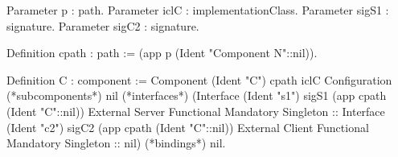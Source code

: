 Parameter p  : path.
Parameter iclC : implementationClass.
Parameter sigS1 : signature.
Parameter sigC2 : signature.

Definition cpath : path := (app p (Ident "Component N"::nil)).

Definition C : component :=
 Component (Ident "C") cpath iclC Configuration
     (*subcomponents*) 
     nil
     (*interfaces*) 
     (Interface (Ident "s1") sigS1 (app cpath (Ident "C"::nil))
               External Server Functional Mandatory Singleton ::
      Interface (Ident "c2") sigC2 (app cpath (Ident "C"::nil))
               External Client Functional Mandatory Singleton :: nil)
      (*bindings*) 
      nil.
